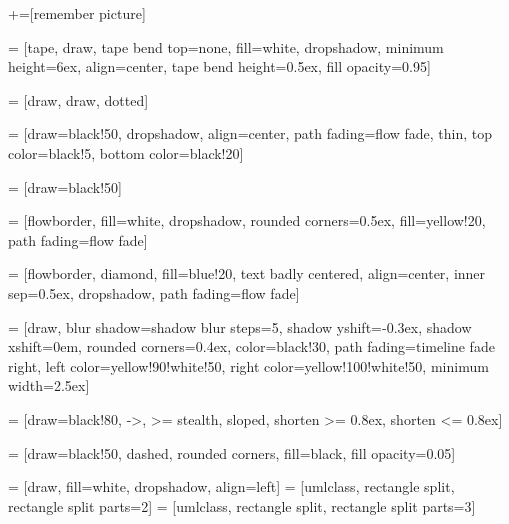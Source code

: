 +=[remember picture]

\newcommand\kernelred{black!20!red!100}

 = [tape, draw, tape bend top=none, fill=white,
                         dropshadow, minimum height=6ex, align=center,
                         tape bend height=0.5ex, fill opacity=0.95]

 = [draw, draw, dotted]

 = [draw=black!50, dropshadow, align=center,
                        path fading=flow fade, thin,
                        top color=black!5, bottom color=black!20]

 = [draw=black!50]

 = [flowborder, fill=white, dropshadow,
                       rounded corners=0.5ex,
                       fill=yellow!20,
                       path fading=flow fade]

 = [flowborder, diamond, fill=blue!20,
                           text badly centered, align=center,
                           inner sep=0.5ex,
                           dropshadow, path fading=flow fade]


 = [draw,
                              blur shadow={shadow blur steps=5},
                              shadow yshift=-0.3ex, shadow xshift=0em,
                              rounded corners=0.4ex,
                              color=black!30,
                              path fading=timeline fade right,
                              left color=yellow!90!white!50,
                              right color=yellow!100!white!50,
                              minimum width=2.5ex]

 = [draw=black!80, ->, >= stealth, sloped,
                               shorten >= 0.8ex, shorten <= 0.8ex]

 = [draw=black!50, dashed,
                             rounded corners, fill=black, fill opacity=0.05]



  = [draw, fill=white, dropshadow, align=left]
 = [umlclass, rectangle split, rectangle split parts=2]
 = [umlclass, rectangle split, rectangle split parts=3]

